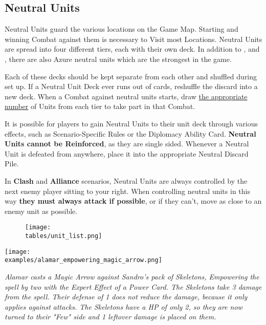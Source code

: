 \begin{multicols}{2}
\subsection*{Neutral Units}
Neutral Units guard the various locations on the Game Map.
Starting and winning Combat against them is necessary to Visit most Locations.
Neutral Units are spread into four different tiers, each with their own deck.
In addition to ,  and , there are also Azure  neutral units which are the strongest in the game.\par
Each of these decks should be kept separate from each other and shuffled during set up.
If a Neutral Unit Deck ever runs out of cards, reshuffle the discard into a new deck.
When a Combat against neutral units starts, draw \hyperlink{Difficulty}{the appropriate number} of Units from each tier to take part in that Combat.\par
It is possible for players to gain Neutral Units to their unit deck through various effects, such as Scenario-Specific Rules or the Diplomacy Ability Card.
\textbf{Neutral Units cannot be Reinforced}, as they are single sided.
Whenever a Neutral Unit is defeated from anywhere, place it into the appropriate Neutral Discard Pile.\par
In \textbf{Clash} and \textbf{Alliance} scenarios, Neutral Units are always controlled by the next enemy player sitting to your right.
When controlling neutral units in this way \textbf{they must always attack if possible}, or if they can't, move as close to an enemy unit as possible.\par

\end{multicols}

\begin{figure*}[!hb]
  \centering
  \texttt{[image: \\tables/unit\_list.png]}
\end{figure*}

\clearpage

\begin{center}
    
    \texttt{[image: \\examples/alamar\_empowering\_magic\_arrow.png]}\par
    
    \textit{Alamar casts a Magic Arrow against Sandro's pack of Skeletons, Empowering  the spell by two with the Expert  Effect  of a Power Card.
    The Skeletons take 3 damage  from the spell.
    Their defense  of 1 does not reduce the damage, because it only applies against attacks.
    The Skeletons have a HP  of only 2, so they are now turned to their "Few" side and 1 leftover damage  is placed on them.}
    
\end{center}
